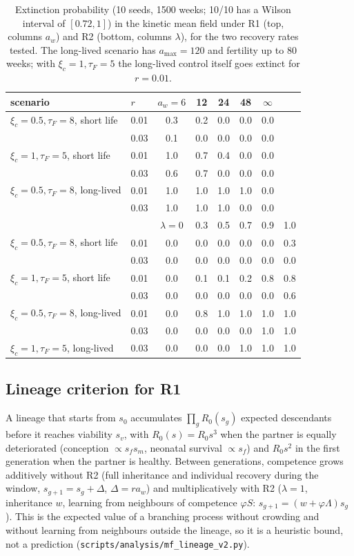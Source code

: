 \begin{table}[h]
\centering\small
\begin{tabular}{llcccccc}
\toprule
scenario & $r$ & $a_w=6$ & 12 & 24 & 48 & $\infty$\\
\midrule
$\xi_c=0.5,\tau_F=8$, short life & 0.01 & 0.3 & 0.2 & 0.0 & 0.0 & 0.0\\
 & 0.03 & 0.1 & 0.0 & 0.0 & 0.0 & 0.0\\
$\xi_c=1,\tau_F=5$, short life & 0.01 & 1.0 & 0.7 & 0.4 & 0.0 & 0.0\\
 & 0.03 & 0.6 & 0.7 & 0.0 & 0.0 & 0.0\\
$\xi_c=0.5,\tau_F=8$, long-lived & 0.01 & 1.0 & 1.0 & 1.0 & 1.0 & 0.0\\
 & 0.03 & 1.0 & 1.0 & 1.0 & 0.0 & 0.0\\
\midrule
 & & $\lambda=0$ & 0.3 & 0.5 & 0.7 & 0.9 & 1.0\\
\midrule
$\xi_c=0.5,\tau_F=8$, short life & 0.01 & 0.0 & 0.0 & 0.0 & 0.0 & 0.0 & 0.3\\
 & 0.03 & 0.0 & 0.0 & 0.0 & 0.0 & 0.0 & 0.0\\
$\xi_c=1,\tau_F=5$, short life & 0.01 & 0.0 & 0.1 & 0.1 & 0.2 & 0.8 & 0.8\\
 & 0.03 & 0.0 & 0.0 & 0.0 & 0.0 & 0.0 & 0.6\\
$\xi_c=0.5,\tau_F=8$, long-lived & 0.01 & 0.0 & 0.8 & 1.0 & 1.0 & 1.0 & 1.0\\
 & 0.03 & 0.0 & 0.0 & 0.0 & 0.0 & 1.0 & 1.0\\
$\xi_c=1,\tau_F=5$, long-lived & 0.03 & 0.0 & 0.0 & 0.0 & 1.0 & 1.0 & 1.0\\
\bottomrule
\end{tabular}
\caption{Extinction probability (10 seeds, 1500 weeks; 10/10 has a Wilson interval of $[0.72,1]$) in the kinetic
mean field under R1 (top, columns $a_w$) and R2 (bottom, columns $\lambda$), for the two recovery rates tested.
The long-lived scenario has $a_{\max}=120$ and fertility up to 80 weeks; with
$\xi_c=1,\tau_F=5$ the long-lived control itself goes extinct for
$r=0.01$.}
\label{tab:thr}
\end{table}

\subsection{Lineage criterion for R1}
\label{app:lineage}

A lineage that starts from $s_0$ accumulates $\prod_g R_0(s_g)$ expected descendants before it reaches viability
$s_v$, with $R_0(s)=R_0s^3$ when the partner is equally deteriorated (conception $\propto s_fs_m$, neonatal survival
$\propto s_f$) and $R_0s^2$ in the first generation when the partner is healthy. Between generations, competence
grows additively without R2 (full inheritance and individual recovery during the window, $s_{g+1}=s_g+\Delta$,
$\Delta=ra_w$) and multiplicatively with R2 ($\lambda=1$, inheritance $w$, learning from neighbours of competence
$\varphi S$: $s_{g+1}=(w+\varphi\Lambda)s_g$). This is the expected value of a branching process without crowding and
without learning from neighbours outside the lineage, so it is a heuristic bound, not a prediction
(\texttt{scripts/analysis/mf\_lineage\_v2.py}).

